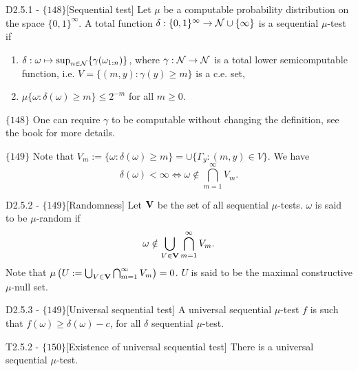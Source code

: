 \documentclass{article}
\begin{document}
\begin{flexidefinition}{D2.5.1 - $\{148\}$}[Sequential test]
    Let $\mu$ be a computable probability distribution on the space $\{0,1\}^\infty$. A total function $\delta : \{0,1\}^\infty \to \mathcal{N} \cup \{ \infty\}$ is a sequential $\mu$-test if 
    \begin{enumerate}[label = (\alph*)]
        \item $\delta : \omega \mapsto \sup_{n \in \mathcal{N}} \{ \gamma(\omega_{1:n})\}$, where $\gamma : \mathcal{N} \to \mathcal{N}$ is a total lower semicomputable function, i.e. $V = \{ (m,y) : \gamma (y) \geq m\}$ is a c.e. set,
        \item $\mu \{ \omega : \delta(\omega) \geq m \} \leq 2^{-m}$ for all $m \geq 0$.
\end{enumerate}
\end{flexidefinition}

$\{148\}$ One can require $\gamma$ to be computable without changing the definition, see the book for more details.

$\{149\}$ Note that $V_m := \{ \omega : \delta(\omega) \geq m \} = \cup \{ \Gamma_y : (m,y) \in V\}$. We have
\begin{equation}
    \delta(\omega) < \infty \iff \omega \notin \bigcap_{m=1}^\infty V_m.
\end{equation}

\begin{flexidefinition}{D2.5.2 - $\{149\}$}[Randomness]
    Let ${\bf V}$ be the set of all sequential $\mu$-tests. $\omega$ is said to be $\mu$-random if 
    \begin{equation}
        \omega \notin \bigcup_{V \in {\bf V}} \bigcap_{m=1}^\infty V_m.
    \end{equation}
    Note that $\mu \left(U := \bigcup_{V \in {\bf V}} \bigcap_{m=1}^\infty V_m\right) = 0$. $U$ is said to be the maximal constructive $\mu$-null set.
    
\end{flexidefinition}

\begin{flexidefinition}{D2.5.3 - $\{149\}$}[Universal sequential test]
    A universal sequential $\mu$-test $f$ is such that $f(\omega) \geq \delta(\omega) - c$, for all $\delta$ sequential $\mu$-test.
\end{flexidefinition}

\begin{flexitheorem}{T2.5.2 - $\{150\}$}[Existence of universal sequential test]
    There is a universal sequential $\mu$-test.
\end{flexitheorem}
\end{document}
